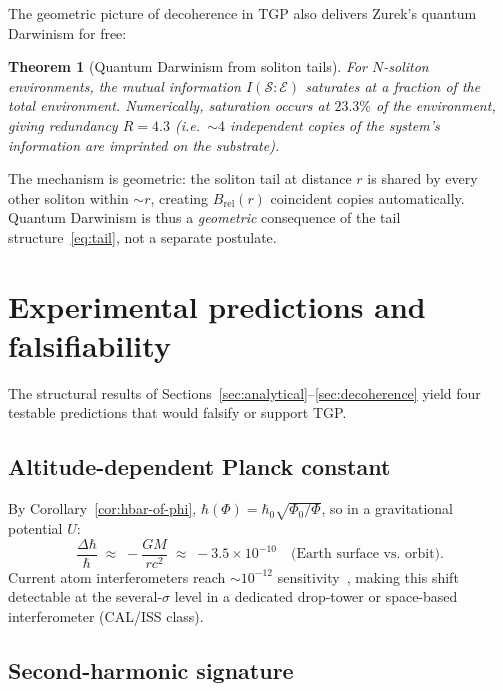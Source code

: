 \documentclass[11pt,a4paper]{article}
\renewcommand{\Phi}{\varPhi}
\newcommand{\PhiZero}{\varPhi_{0}}
\newcommand{\hbarzero}{\hbar_{0}}
\newcommand{\Nwind}{B}
\newtheorem{theorem}{Theorem}
\begin{document}
The geometric picture of decoherence in TGP also delivers
Zurek's quantum Darwinism for free:

\begin{theorem}[Quantum Darwinism from soliton tails]\label{thm:darwin}
For $N$-soliton environments, the mutual information
$I(\mathcal{S}:\mathcal{E})$ saturates at a fraction of the total
environment. Numerically, saturation occurs at
$23.3\%$ of the environment, giving redundancy $R=4.3$ (i.e.\
$\sim 4$ independent copies of the system's information are imprinted
on the substrate).
\end{theorem}

The mechanism is geometric: the soliton tail at distance $r$ is
shared by every other soliton within $\sim r$, creating
$\Nwind_{\mathrm{rel}}(r)$ coincident copies automatically.
Quantum Darwinism is thus a \emph{geometric} consequence of
the tail structure~\eqref{eq:tail}, not a separate postulate.

\section{Experimental predictions and falsifiability}\label{sec:predictions}

The structural results of Sections~\ref{sec:analytical}--\ref{sec:decoherence}
yield four testable predictions that would falsify or support TGP.

\subsection{Altitude-dependent Planck constant}

By Corollary~\ref{cor:hbar-of-phi},
$\hbar(\Phi)=\hbarzero\sqrt{\PhiZero/\Phi}$, so in a gravitational
potential $U$:
\begin{equation}\label{eq:hbar-GM}
  \frac{\Delta\hbar}{\hbar} \;\approx\; -\frac{GM}{r c^{2}}
  \;\approx\; -3.5\times 10^{-10}\quad\text{(Earth surface vs.\ orbit)}.
\end{equation}
Current atom interferometers reach $\sim 10^{-12}$
sensitivity~\cite{MultiInterferometer,SYRTE}, making this shift
detectable at the several-$\sigma$ level in a dedicated drop-tower
or space-based interferometer (CAL/ISS class).

\subsection{Second-harmonic signature}
\end{document}
